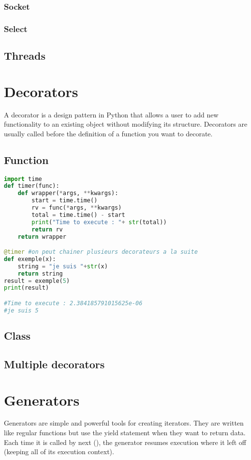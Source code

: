 \documentclass[a4paper, 12pt]{article}
\begin{document}
\subsubsection{Socket}
\subsubsection{Select}
\subsection{Threads}

\newpage
\section{Decorators}
A decorator is a design pattern in Python that allows a user to add new functionality to an existing object without modifying its structure. Decorators are usually called before the definition of a function you want to decorate.\newline
\subsection{Function}
\begin{lstlisting}[language=Python]
import time
def timer(func):
	def wrapper(*args, **kwargs):
		start = time.time()
		rv = func(*args, **kwargs)
		total = time.time() - start
		print("Time to execute : "+ str(total))
		return rv
	return wrapper

@timer #on peut chainer plusieurs decorateurs a la suite 
def exemple(x):
	string = "je suis "+str(x)
	return string
result = exemple(5)
print(result)

#Time to execute : 2.384185791015625e-06
#je suis 5
\end{lstlisting}

\subsection{Class}
\subsection{Multiple decorators}

\newpage
\section{Generators}
\label{sec:Generators}
Generators are simple and powerful tools for creating iterators. They are written like regular functions but use the yield statement when they want to return data. Each time it is called by next (), the generator resumes execution where it left off (keeping all of its execution context).\newline
\end{document}
